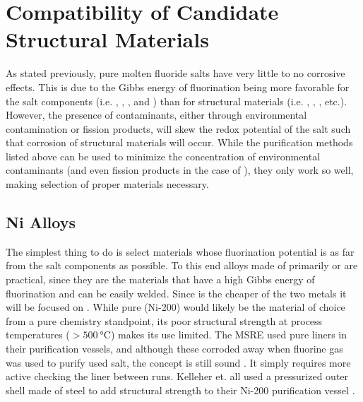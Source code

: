%
%

\section{Compatibility of Candidate Structural Materials}
\label{sec: compatability of candidate}

As stated previously, pure molten fluoride salts have very little to no
corrosive effects. This is due to the Gibbs energy of fluorination being
more favorable for the salt components (i.e. , , ,
and ) than for structural materials (i.e. , ,
, etc.). However, the presence of contaminants, either through
environmental contamination or fission products, will skew the redox
potential of the salt such that corrosion of structural materials
will occur. While the purification methods listed above can be used
to minimize the concentration of environmental contaminants (and even
fission products in the case of ), they only work so well,
making selection of proper materials necessary. \par

\subsection{Ni Alloys}
\label{sec: ni alloys}

The simplest thing to do is select materials whose fluorination potential
is as far from the salt components as possible. To this end alloys made
of primarily  or  are practical, since they are the
materials that have a high Gibbs energy of fluorination and can be easily
welded. Since  is the cheaper of the two metals it will be focused
on \cite{rev49}. While pure  (Ni-200) would likely be the material
of choice from a pure chemistry standpoint, its poor structural strength
at process temperatures ($>\SI{500}{\celsius}$) makes its use limited.
The MSRE used pure  liners in their purification vessels, and
although these corroded away when fluorine gas was used to purify used
salt, the concept is still sound \cite{rev21}. It simply requires
more active checking the liner between runs. Kelleher et. all used
a pressurized outer shell made of steel to add structural strength to
their Ni-200 purification vessel \cite{rev29}. \par

